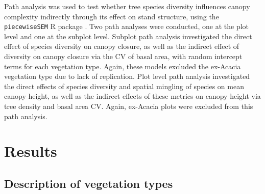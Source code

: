 \documentclass[11pt,a4paper]{article}
\begin{document}
Path analysis was used to test whether tree species diversity influences canopy complexity indirectly through its effect on stand structure, using the \texttt{piecewiseSEM} R package \citep{piecewiseSEM}. Two path analyses were conducted, one at the plot level and one at the subplot level. Subplot path analysis investigated the direct effect of species diversity on canopy closure, as well as the indirect effect of diversity on canopy closure via the CV of basal area, with random intercept terms for each vegetation type. Again, these models excluded the ex-Acacia vegetation type due to lack of replication. Plot level path analysis investigated the direct effects of species diversity and spatial mingling of species on mean canopy height, as well as the indirect effects of these metrics on canopy height via tree density and basal area CV. Again, ex-Acacia plots were excluded from this path analysis.






\section{Results}

\subsection{Description of vegetation types}
\end{document}
